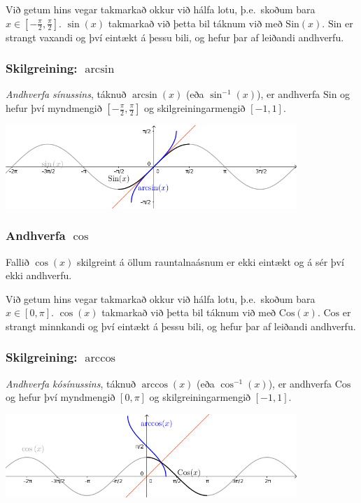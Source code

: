 \documentclass[icelandic,a4paper,12pt]{article}
\newcommand{\Sin}{{\text{Sin}}}
\newcommand{\Cos}{{\text{Cos}}}
\begin{document}
Við getum hins vegar takmarkað okkur við hálfa lotu, þ.e.~skoðum
bara $x\in [-\frac \pi 2, \frac \pi 2]$. \pause $\sin(x)$ takmarkað 
við þetta bil táknum við með $\Sin(x)$. \pause $\Sin$ er strangt 
vaxandi og því eintækt á þessu bili, og hefur þar af leiðandi andhverfu.

\pause

\subsubsection{Skilgreining: $\arcsin$}
\emph{Andhverfa sínussins}, táknuð $\arcsin(x)$ (eða $\sin^{-1}(x)$), 
er andhverfa $\Sin$ og hefur því myndmengið $[-\frac \pi 2, 
\frac \pi 2]$ og skilgreiningarmengið $[-1,1]$.
 
\begin{center}
\includegraphics[width=11cm,keepaspectratio=true]{./myndir/kafli04/05_arcsin.png}
\end{center}

\subsubsection{Andhverfa $\cos$}
Fallið $\cos(x)$ skilgreint á öllum rauntalnaásnum er ekki 
eintækt og á sér því ekki andhverfu. 

\pause

Við getum hins vegar takmarkað okkur við hálfa lotu, þ.e.~skoðum
bara $x\in [0, \pi]$. \pause $\cos(x)$ takmarkað 
við þetta bil táknum við með $\Cos(x)$. \pause $\Cos$ er strangt 
minnkandi og því eintækt á þessu bili, og hefur þar af leiðandi andhverfu.

\pause

\subsubsection{Skilgreining: $\arccos$}
\emph{Andhverfa kósínussins}, táknuð $\arccos(x)$ (eða $\cos^{-1}(x)$), 
er andhverfa $\Cos$ og hefur því myndmengið $[0,\pi]$ 
og skilgreiningarmengið $[-1,1]$.
 
\begin{center}
\includegraphics[width=11cm,keepaspectratio=true]{./myndir/kafli04/05_arccos.png}
\end{center}
\end{document}
